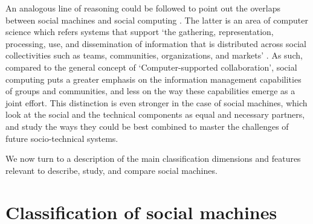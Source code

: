 \documentclass{sig-alternate}
\begin{document}
An analogous line of reasoning could be followed to point out the overlaps between social machines and social computing \cite{parameswaran2007research}. The latter is an area of computer science which refers systems that support `the gathering, representation, processing, use, and dissemination of information that is distributed across social collectivities such as teams, communities, organizations, and markets' \cite{parameswaran2007research}. As such, compared to the general concept of `Computer-supported collaboration', social computing puts a greater emphasis on the information management capabilities of groups and communities, and less on the way these capabilities emerge as a joint effort. This distinction is even stronger in the case of social machines, which look at the social and the technical components as equal and necessary partners, and study the ways they could be best combined to master the challenges of future socio-technical systems.

We now turn to a description of the main classification dimensions and features relevant to describe, study, and compare social machines.

\section{Classification of social machines}
\label{sec:framework}
\end{document}
